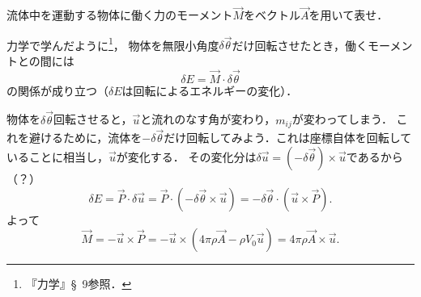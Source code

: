 \begin{mondai}{}{}
流体中を運動する物体に働く力のモーメント$\vec{M}$をベクトル$\vec{A}$を用いて表せ．
\end{mondai}
\begin{kaitou}
力学で学んだように\footnote{『力学』\S~9参照．}，
物体を無限小角度$\delta\vec{\theta}$だけ回転させたとき，働くモーメントとの間には
\[
    \delta E = \vec{M} \cdot \delta\vec{\theta}
\]
の関係が成り立つ（$\delta E$は回転によるエネルギーの変化）．

物体を$\delta\vec{\theta}$回転させると，$\vec{u}$と流れのなす角が変わり，$m_{ij}$が変わってしまう．
これを避けるために，流体を$-\delta\vec{\theta}$だけ回転してみよう．これは座標自体を回転していることに相当し，$\vec{u}$が変化する．
その変化分は$\delta\vec{u}=(-\delta\vec{\theta})\times\vec{u}$であるから（？）
\[
    \delta E = \vec{P} \cdot \delta\vec{u}
    = \vec{P} \cdot (-\delta\vec{\theta}\times\vec{u})
    = -\delta\vec{\theta} \cdot (\vec{u}\times\vec{P}) .
\]
よって
\[
    \vec{M} = -\vec{u}\times\vec{P} 
    = -\vec{u}\times( 4\pi\rho\vec{A} - \rho V_0 \vec{u} )
    = 4\pi\rho \vec{A}\times\vec{u} .
\]

\end{kaitou}

    




\BackToTheToc